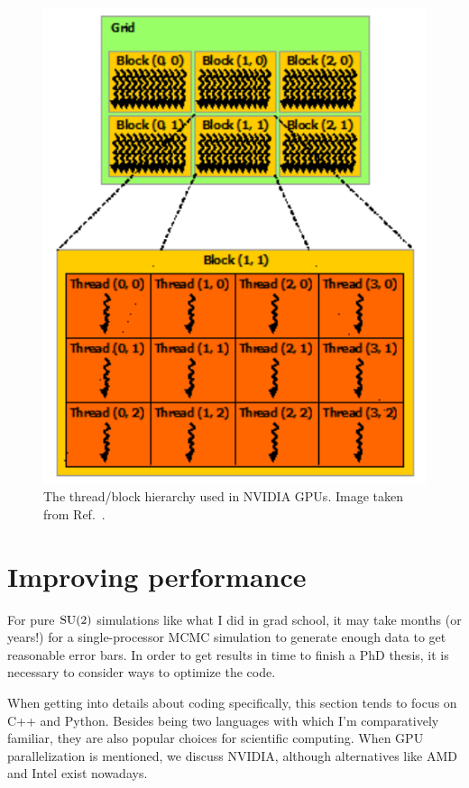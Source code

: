 \begin{figure}
\includegraphics[width=\linewidth]{figs/threadBlock.pdf}
\caption{The thread/block hierarchy used in NVIDIA GPUs.
Image taken from Ref.~\cite{NVIDIA}.}
\label{fig:threadBlock}
\end{figure}


\section{Improving performance}

For pure $\operatorname{SU}(2)$ simulations like what I did in grad school, 
it may take months (or years!) for a single-processor MCMC simulation to
generate enough data to get reasonable error bars. In order to get
results in time to finish a PhD thesis, it is necessary to consider ways to
optimize the code.

When getting into details about coding specifically, this section tends to focus
on C++ and Python. Besides being two languages with which I'm comparatively
familiar, they are also popular choices for scientific computing. When GPU
parallelization is mentioned, we discuss NVIDIA, although alternatives like AMD
and Intel exist nowadays.

